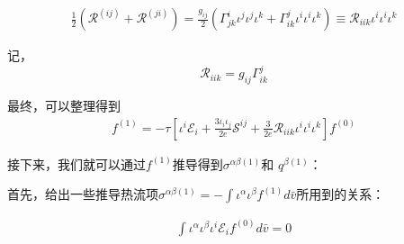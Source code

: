 \documentclass[LBMDerivation.tex]{subfiles}
\begin{document}
\begin{equation}
  \begin{gathered}
    \frac{1}{2}(\mathcal{R}^{(ij)}+\mathcal{R}^{(ji)})=\frac{g_{ij}}{2}(\Gamma_{jk}^i \iota^j\iota^j\iota^k + \Gamma_{ik}^j \iota^i\iota^i\iota^k )  \equiv \mathcal{R}_{iik} \iota^i\iota^i\iota^k
  \end{gathered}
\end{equation}

记，
$$
  \mathcal{R}_{iik} =g_{ij}\Gamma_{ik}^j
$$






最终，可以整理得到
\begin{equation}
  \boxed{
    \begin{gathered}
      f^{(1)}=
      -\tau [ \iota^i\mathcal{E}_i
        +\frac{3\iota_i \iota_j}{2e} \mathcal{S}^{ij}
        + \frac{3}{2e} \mathcal{R}_{iik} \iota^i\iota^i\iota^k
      ]{f^{(0)}}
    \end{gathered}
  }
\end{equation}



接下来，我们就可以通过$f^{(1)}$推导得到$\sigma^{\alpha\beta(1)}$和 $q^{\beta (1)}$：


首先，给出一些推导热流项$ \sigma^{\alpha\beta(1)}=-\int \iota^{\alpha} \iota^{\beta} f^{(1)}  d \bar{v}$所用到的关系：

\begin{equation}
  \begin{gathered}
    \int \iota^\alpha \iota^\beta \iota^i \mathcal{E}_i f^{(0)} d \bar{v}=0
  \end{gathered}
\end{equation}
\end{document}
